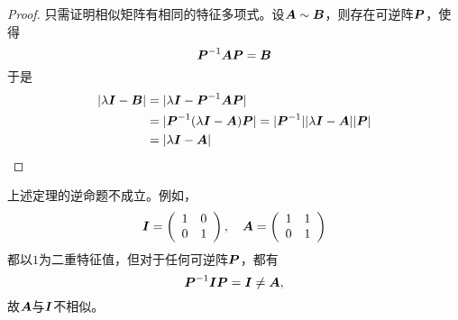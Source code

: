 \begin{frame}
  \begin{dingli}
  \end{dingli}
  \vspace{.1in}\pause 
  \begin{proof}
  只需证明相似矩阵有相同的特征多项式。设$\boldsymbol{A}\sim\boldsymbol{B}$，则存在可逆阵$\boldsymbol{P}$，使得
  $$
  \boldsymbol{P}^{-1}\boldsymbol{A}\boldsymbol{P} = \boldsymbol{B}
  $$
  于是
  $$
  \begin{aligned}
    |\lambda\boldsymbol{I}-\boldsymbol{B}|&=|\lambda\boldsymbol{I}-\boldsymbol{P}^{-1}\boldsymbol{A}\boldsymbol{P}|\\
    &=|\boldsymbol{P}^{-1}(\lambda\boldsymbol{I}-\boldsymbol{A})\boldsymbol{P}|=|\boldsymbol{P}^{-1}||\lambda\boldsymbol{I}-\boldsymbol{A}||\boldsymbol{P}|\\
    &=|\lambda\boldsymbol{I}-\boldsymbol{A}|
  \end{aligned}
  $$
\end{proof}
\end{frame}

\begin{frame}
  \begin{zhu}
    上述定理的逆命题不成立。例如，
    $$
    \boldsymbol{I} = \left(
      \begin{array}{cc}
        1&0\\
        0&1
      \end{array}
    \right),\quad
    \boldsymbol{A} = \left(
      \begin{array}{cc}
        1&1\\
        0&1
      \end{array}
    \right)
    $$
    都以$1$为二重特征值，但对于任何可逆阵$\boldsymbol{P}$，都有
    $$
    \boldsymbol{P}^{-1}\boldsymbol{I}\boldsymbol{P}=\boldsymbol{I}\ne \boldsymbol{A},
    $$
    故$\boldsymbol{A}$与$\boldsymbol{I}$不相似。
  \end{zhu}
\end{frame}

\begin{frame}

\end{frame}